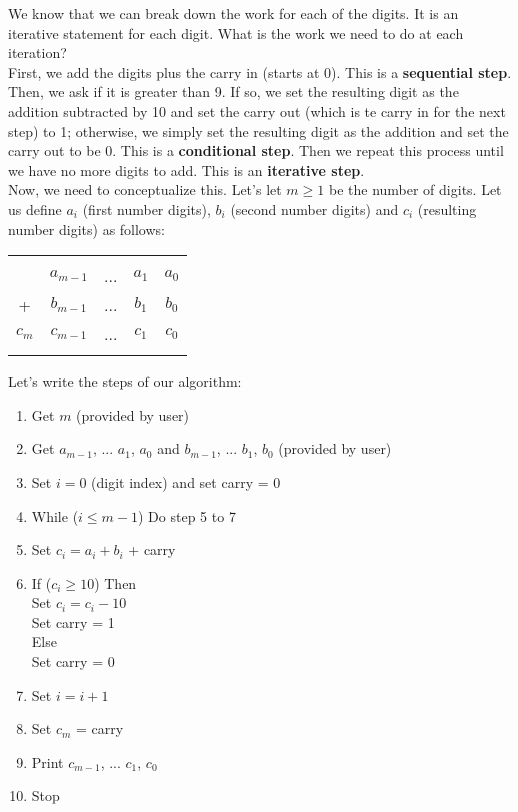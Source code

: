 \documentclass[]{article}
\begin{document}
\noindent We know that we can break down the work for each of the digits. It is an iterative statement for each digit. What is the work we need to do at each iteration?\\

\noindent First, we add the digits plus the carry in (starts at 0). This is a \textbf{sequential step}. Then, we ask if it is greater than 9. If so, we set the resulting digit as the addition subtracted by 10 and set the carry out (which is te carry in for the next step) to 1; otherwise, we simply set the resulting digit as the addition and set the carry out to be 0. This is a \textbf{conditional step}. Then we repeat this process until we have no more digits to add. This is an \textbf{iterative step}.\\

\noindent Now, we need to conceptualize this. Let's let $m \geq 1$ be the number of digits. Let us define $a_i$ (first number digits), $b_i$ (second number digits) and $c_i$ (resulting number digits) as follows:

\begin{tabular}{ccccc}
	& \tiny & \tiny & \tiny & \tiny \\
	& $a_{m-1}$ & ... & $a_{1}$ & $a_{0}$ \\
	+ & $b_{m-1}$ & ... & $b_{1}$ & $b_{0}$ \\
	\hline
	$c_{m}$ & $c_{m-1}$ & ... & $c_{1}$ & $c_{0}$ \\\smallskip
\end{tabular}

\noindent Let's write the steps of our algorithm:
\begin{enumerate}
	\item Get $m$ (provided by user)
	\item Get $a_{m-1}$, ...  $a_{1}$, $a_{0}$ and $b_{m-1}$, ...  $b_{1}$, $b_{0}$ (provided by user)
	\item Set $i = 0$ (digit index) and set carry = 0 
	\item While ($i \leq m - 1$) Do step 5 to 7 \setlength{\itemindent}{0.5cm}
	\item Set $c_i = a_i + b_i$ + carry
	\item If ($c_i \geq 10$) Then\\
			\tabto{1cm}Set $c_i = c_i - 10$\\
			\tabto{1cm}Set carry = 1\\ 
		\tabto{0.5cm}Else\\
			\tabto{1cm}Set carry = 0 
	\item Set $i = i + 1$
	\setlength{\itemindent}{0cm}\item Set $c_m$ = carry
	\item Print $c_{m-1}$, ...  $c_{1}$, $c_{0}$ 
	\item Stop\smallskip
\end{enumerate}
\end{document}
